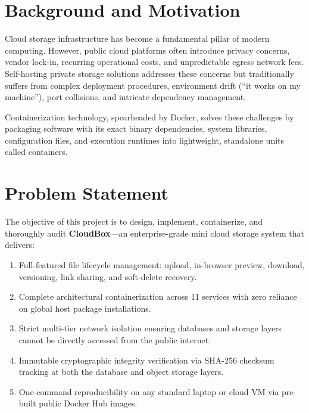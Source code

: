 \documentclass[11pt,a4paper]{report}
\begin{document}
\section{Background and Motivation}
Cloud storage infrastructure has become a fundamental pillar of modern computing. However, public cloud platforms often introduce privacy concerns, vendor lock-in, recurring operational costs, and unpredictable egress network fees. Self-hosting private storage solutions addresses these concerns but traditionally suffers from complex deployment procedures, environment drift (``it works on my machine''), port collisions, and intricate dependency management. 

Containerization technology, spearheaded by Docker, solves these challenges by packaging software with its exact binary dependencies, system libraries, configuration files, and execution runtimes into lightweight, standalone units called containers.

\section{Problem Statement}
The objective of this project is to design, implement, containerize, and thoroughly audit \textbf{CloudBox}---an enterprise-grade mini cloud storage system that delivers:
\begin{enumerate}[itemsep=1pt,topsep=1pt]
    \item Full-featured file lifecycle management: upload, in-browser preview, download, versioning, link sharing, and soft-delete recovery.
    \item Complete architectural containerization across 11 services with zero reliance on global host package installations.
    \item Strict multi-tier network isolation ensuring databases and storage layers cannot be directly accessed from the public internet.
    \item Immutable cryptographic integrity verification via SHA-256 checksum tracking at both the database and object storage layers.
    \item One-command reproducibility on any standard laptop or cloud VM via pre-built public Docker Hub images.
\end{enumerate}
\end{document}
